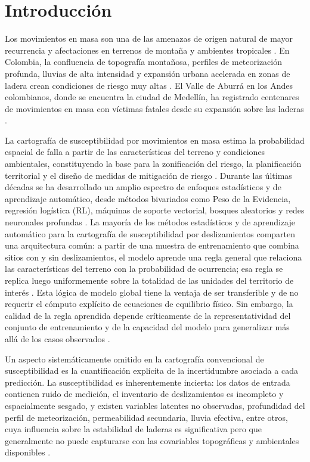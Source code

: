 \documentclass[12pt, a4paper]{article}
\begin{document}
\section{Introducción}
\label{sec:introduccion}

Los movimientos en masa son una de las amenazas de origen natural de mayor recurrencia y afectaciones en terrenos de montaña y
ambientes tropicales \citep{Varnes1978, Hungr2014, Gomez2023}. En Colombia, la confluencia de topografía montañosa, perfiles de meteorización
profunda, lluvias de alta intensidad y expansión urbana acelerada en zonas de ladera crean condiciones de riesgo muy altas
\citep{Aristizabal2012}. El Valle de Aburrá en los Andes colombianos, donde se encuentra la ciudad de Medellín, ha registrado
centenares de movimientos en masa con víctimas fatales desde su expansión sobre las laderas \citep{Nieto2025, Klimes2010}.

La cartografía de susceptibilidad por movimientos en masa estima la probabilidad espacial de falla a partir de las características
del terreno y condiciones ambientales, constituyendo la base para la zonificación del riesgo, la planificación territorial y el diseño 
de medidas de mitigación de riesgo \citep{Guzzetti2005, Corominas2014}. Durante las últimas décadas se ha desarrollado un amplio 
espectro de enfoques estadísticos
y de aprendizaje automático, desde métodos bivariados como Peso de la Evidencia, regresión logística (RL), máquinas de soporte vectorial, bosques
aleatorios y redes neuronales profundas \citep{Reichenbach2018, Chen2017, Corominas2014}. La mayoría de los métodos estadísticos y de 
aprendizaje automático para la cartografía de susceptibilidad por deslizamientos comparten una
arquitectura común: a partir de una muestra de entrenamiento que combina sitios con y sin deslizamientos, el modelo aprende una
regla general que relaciona las características del terreno con la probabilidad de ocurrencia; esa regla se replica luego
uniformemente sobre la totalidad de las unidades del territorio de interés \citep{VanWesten2003, Reichenbach2018}. Esta lógica de modelo global
tiene la ventaja de ser transferible y de no requerir el cómputo explícito de ecuaciones de equilibrio físico. Sin embargo, la
calidad de la regla aprendida depende críticamente de la representatividad del conjunto de entrenamiento y de la capacidad del
modelo para generalizar más allá de los casos observados \citep{Heckmann2014}.

Un aspecto sistemáticamente omitido en la cartografía convencional de susceptibilidad es la cuantificación explícita de la
incertidumbre asociada a cada predicción. La susceptibilidad es inherentemente incierta: los datos de entrada contienen ruido de
medición, el inventario de deslizamientos es incompleto y espacialmente sesgado, y existen variables latentes no observadas, 
profundidad del perfil de meteorización, permeabilidad secundaria, lluvia efectiva, entre otros, cuya influencia sobre la estabilidad de laderas
es significativa pero que generalmente no puede capturarse con las covariables topográficas y ambientales disponibles \citep{Corominas2014}.
\end{document}
